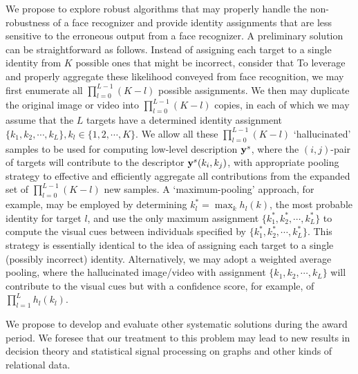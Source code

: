 We propose to explore robust algorithms that may properly handle the non-robustness of a face recognizer and provide identity assignments that are less sensitive to the erroneous output from a face recognizer. A preliminary solution can be straightforward as follows. Instead of assigning each target to a single identity from $K$ possible ones that might be incorrect, consider that To leverage and properly aggregate these likelihood conveyed from face recognition, we may first enumerate all $\prod_{l=0}^{L-1}(K-l)$ possible assignments. We then may duplicate the original image or video into $\prod_{l=0}^{L-1}(K-l)$ copies, in each of which we may assume that the $L$ targets have a determined identity assignment $\{k_1, k_2, \cdots, k_L\}, k_l\in\{1,2, \cdots, K\}$. We allow all these $\prod_{l=0}^{L-1}(K-l)$ `hallucinated' samples to be used for computing low-level description ${\bf y}^s$, where the $(i,j)$-pair of targets will contribute to the descriptor ${\bf y}^s(k_i,k_j)$, with appropriate pooling strategy to effective and efficiently aggregate all contributions from the expanded set of $\prod_{l=0}^{L-1}(K-l)$ new samples. A `maximum-pooling' approach, for example, may be employed by determining $k_l^{*}=\max_{k}h_l(k)$, the most probable identity for target $l$, and use the only maximum assignment $\{k_1^{*}, k_2^{*}, \cdots, k_L^{*}\}$ to compute the visual cues between individuals specified by $\{k_1^{*}, k_2^{*}, \cdots, k_L^{*}\}$. This strategy is essentially identical to the idea of assigning each target to a single (possibly incorrect) identity. Alternatively, we may adopt a weighted average pooling, where the hallucinated image/video with assignment $\{k_1, k_2, \cdots, k_L\}$ will contribute to the visual cues but with a confidence score, for example, of $\prod_{l=1}^{L}h_l(k_l)$.

We propose to develop and evaluate other systematic solutions during the award period. We foresee that our treatment to this problem may lead to new results in decision theory and statistical signal processing on graphs and other kinds of relational data.

